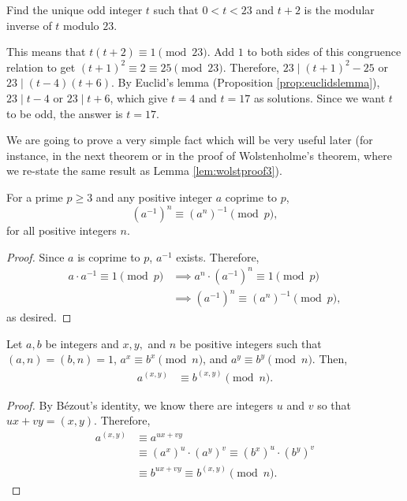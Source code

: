 \documentclass{subfile}
\begin{document}
	
	\begin{problem}
		Find the unique odd integer $t$ such that $0<t<23$ and $t+2$ is the modular inverse of $t$ modulo $23$.
	\end{problem}
	
	\begin{solution}
		This means that $t(t+2)\equiv 1 \pmod{23}$. Add $1$ to both sides of this congruence relation to get $(t+1)^2 \equiv 2 \equiv 25\pmod{23}$. Therefore, $23\mid (t+1)^2-25$ or $23\mid (t-4)(t+6)$. By Euclid's lemma (Proposition \ref{prop:euclidslemma}), $23\mid t-4$ or $23\mid t+6$, which give $t=4$ and $t=17$ as solutions. Since we want $t$ to be odd, the answer is $t=17$.
	\end{solution}

We are going to prove a very simple fact which will be very useful later (for instance, in the next theorem or in the proof of Wolstenholme's theorem, where we re-state the same result as Lemma \ref{lem:wolstproof3}).

	\begin{proposition}\label{prop:inversepower}
		For a prime $p\geq 3$ and any positive integer $a$ coprime to $p$,
		\[ (a^{-1})^n \equiv (a^n)^{-1} \pmod p,\]
		for all positive integers $n$.
	\end{proposition}

	\begin{proof}
		Since $a$ is coprime to $p$, $a^{-1}$ exists. Therefore,
			\begin{align*}
				a \cdot a^{-1} \equiv 1 \pmod p &\implies a^n \cdot (a^{-1})^n \equiv 1 \pmod p\\
				&\implies (a^{-1})^n \equiv (a^n)^{-1} \pmod p,
			\end{align*}
		as desired.
	\end{proof}

	

	\begin{theorem}\label{thm:modgcd}
	Let $a,b$ be integers and $x,y,$ and $n$ be positive integers such that $(a,n)=(b,n)=1$,  $a^x\equiv b^x\pmod n$, and $a^y\equiv b^y\pmod n$. Then,
	\begin{align*}
		a^{(x,y)} & \equiv b^{(x,y)}\pmod n.
	\end{align*}
\end{theorem}

\begin{proof}
	By B\'{e}zout's identity, we know there are integers $u$ and $v$ so that $ux+vy=(x,y)$. Therefore,
	\begin{align}
		a^{(x,y)} &\equiv a^{ux+vy}\nonumber\\
		&\equiv \left(a^x\right)^u \cdot \left(a^y\right)^v \equiv \left(b^x\right)^u \cdot \left(b^y\right)^v\label{eq:modgcd}\\
		&\equiv b^{ux+vy} \equiv b^{(x,y)} \pmod n.\nonumber
	\end{align}
\end{proof}
\end{document}

